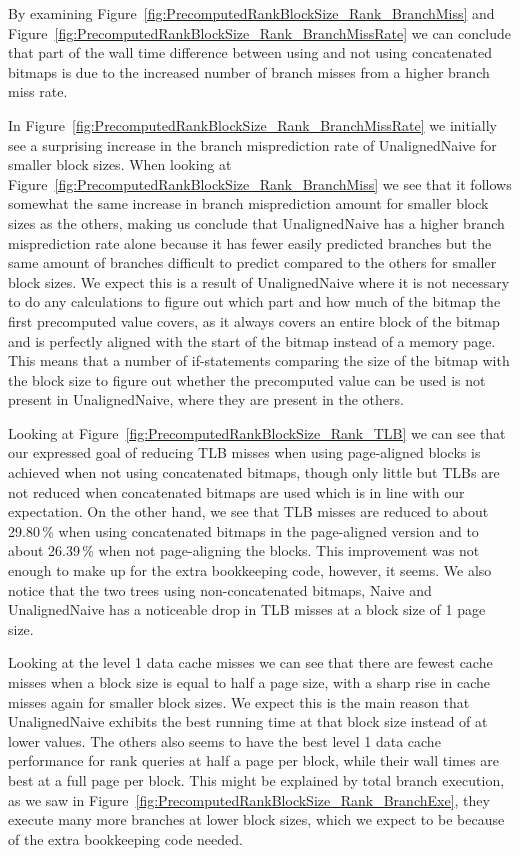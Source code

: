 By examining Figure~\ref{fig:PrecomputedRankBlockSize_Rank_BranchMiss} and Figure~\ref{fig:PrecomputedRankBlockSize_Rank_BranchMissRate} we can conclude that part of the wall time difference between using and not using concatenated bitmaps is due to the increased number of branch misses from a higher branch miss rate.

In Figure~\ref{fig:PrecomputedRankBlockSize_Rank_BranchMissRate} we initially see a surprising increase in the branch misprediction rate of UnalignedNaive for smaller block sizes.
When looking at Figure~\ref{fig:PrecomputedRankBlockSize_Rank_BranchMiss} we see that it follows somewhat the same increase in branch misprediction amount for smaller block sizes as the others, making us conclude that UnalignedNaive has a higher branch misprediction rate alone because it has fewer easily predicted branches but the same amount of branches difficult to predict compared to the others for smaller block sizes.
We expect this is a result of UnalignedNaive where it is not necessary to do any calculations to figure out which part and how much of the bitmap the first precomputed value covers, as it always covers an entire block of the bitmap and is perfectly aligned with the start of the bitmap instead of a memory page.
This means that a number of if-statements comparing the size of the bitmap with the block size to figure out whether the precomputed value can be used is not present in UnalignedNaive, where they are present in the others.

Looking at Figure~\ref{fig:PrecomputedRankBlockSize_Rank_TLB} we can see that our expressed goal of reducing TLB misses when using page-aligned blocks is achieved when not using concatenated bitmaps, though only little but TLBs are not reduced when concatenated bitmaps are used which is in line with our expectation.
On the other hand, we see that TLB misses are reduced to about 29.80\,\% when using concatenated bitmaps in the page-aligned version and to about 26.39\,\% when not page-aligning the blocks.
This improvement was not enough to make up for the extra bookkeeping code, however, it seems.
We also notice that the two trees using non-concatenated bitmaps, Naive and UnalignedNaive has a noticeable drop in TLB misses at a block size of 1 page size.


Looking at the level 1 data cache misses we can see that there are fewest cache misses when a block size is equal to half a page size, with a sharp rise in cache misses again for smaller block sizes.
We expect this is the main reason that UnalignedNaive exhibits the best running time at that block size instead of at lower values.
The others also seems to have the best level 1 data cache performance for rank queries at half a page per block, while their wall times are best at a full page per block.
This might be explained by total branch execution, as we saw in Figure~\ref{fig:PrecomputedRankBlockSize_Rank_BranchExe}, they execute many more branches at lower block sizes, which we expect to be because of the extra bookkeeping code needed.


